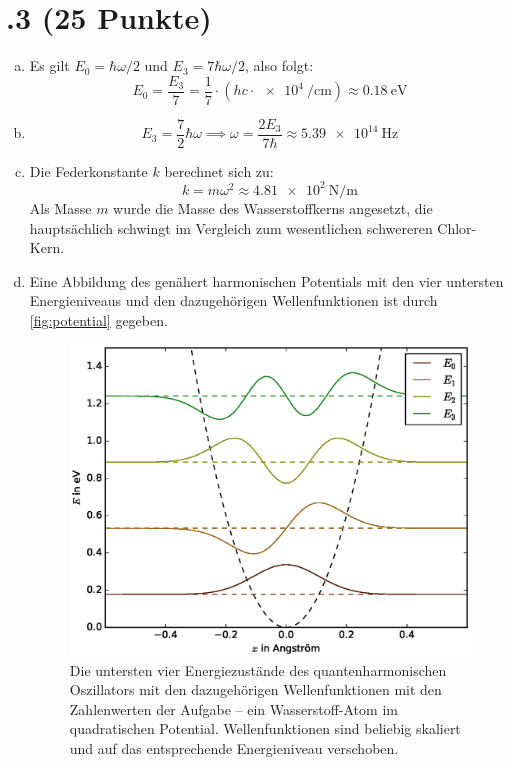 \section*{\nr.3 \titthree (25 Punkte)}
\begin{enumerate}[(a)]
\item Es gilt $E_0 = \hbar\omega/2$ und $E_3=7\hbar\omega/2$, also folgt:
\begin{equation}
E_0 = \frac{E_3}{7} = \frac{1}{7} \cdot \left(h c \cdot\SI{e4}{\per\centi\meter}\right) \approx \SI{0.18}{\electronvolt}
\end{equation}

\item 
\begin{equation}
E_3=\frac{7}{2}\hbar\omega \implies \omega = \frac{2E_3}{7\hbar} \approx \SI{5.39e14}{\hertz}
\end{equation}

\item Die Federkonstante $k$ berechnet sich zu:
\begin{equation}
k = m \omega^2 \approx \SI{4.81e2}{\newton\per\meter}
\end{equation}
Als Masse $m$ wurde die Masse des Wasserstoffkerns angesetzt, die hauptsächlich schwingt im Vergleich zum wesentlichen schwereren Chlor-Kern.
\item Eine Abbildung des genähert harmonischen Potentials mit den vier untersten Energieniveaus und den dazugehörigen Wellenfunktionen ist durch \vref{fig:potential} gegeben.
\begin{figure}[htbp]
\centering
\includegraphics[width=\textwidth]{harmonic_potential.eps}
\caption{Die untersten vier Energiezustände des quantenharmonischen Oszillators mit den dazugehörigen Wellenfunktionen mit den Zahlenwerten der Aufgabe -- ein Wasserstoff-Atom im quadratischen Potential. Wellenfunktionen sind beliebig skaliert und auf das entsprechende Energieniveau verschoben.}
\label{fig:potential}
\end{figure}
\end{enumerate}